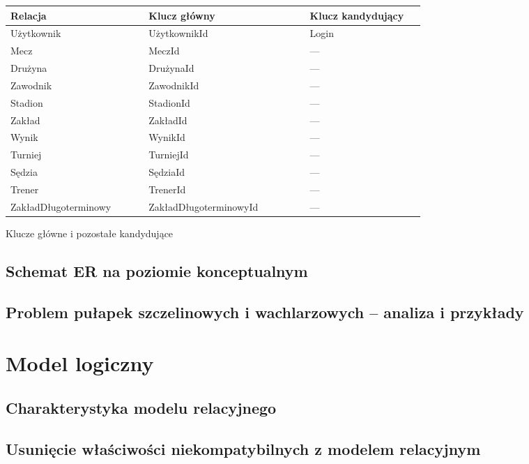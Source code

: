 \documentclass{mwrep}[15pt]
\begin{document}
\vspace{1cm}
\begin{threeparttable}[H]
	\begin{tabular}{|p{0.3\linewidth}|p{0.35\linewidth}|p{0.25\linewidth}|}
	\hline
	Relacja & Klucz główny & Klucz kandydujący \\ \hline
	Użytkownik & UżytkownikId & Login \\ \hline
	Mecz & MeczId & --- \\ \hline
	Drużyna & DrużynaId & --- \\ \hline
	Zawodnik & ZawodnikId & --- \\ \hline
	Stadion & StadionId & --- \\ \hline
	Zakład & ZakładId & --- \\ \hline
	Wynik & WynikId & --- \\ \hline
	Turniej & TurniejId & --- \\ \hline
	Sędzia & SędziaId & --- \\ \hline
	Trener & TrenerId & --- \\ \hline
	ZakładDługoterminowy & ZakładDługoterminowyId & --- \\ \hline
	\end{tabular}	
	\caption{Klucze główne i pozostałe kandydujące}
\end{threeparttable}
\vspace{1cm}

\section{Schemat ER na poziomie konceptualnym}
\newpage

\section{Problem pułapek szczelinowych i wachlarzowych – analiza i przykłady}



\chapter{Model logiczny}

\section{Charakterystyka modelu relacyjnego}

\section{Usunięcie właściwości niekompatybilnych z modelem relacyjnym}
\end{document}
